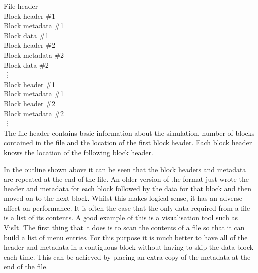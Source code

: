 \documentclass[12pt]{article}
\begin{document}
\noindent
\hspace*{10mm}File header\\
\hspace*{15mm}Block header \#1\\
\hspace*{20mm}Block metadata \#1\\
\hspace*{25mm}Block data \#1\\
\hspace*{15mm}Block header \#2\\
\hspace*{20mm}Block metadata \#2\\
\hspace*{25mm}Block data \#2\\
\hspace*{25mm}\vdots\\
\hspace*{15mm}Block header \#1\\
\hspace*{20mm}Block metadata \#1\\
\hspace*{15mm}Block header \#2\\
\hspace*{20mm}Block metadata \#2\\
\hspace*{25mm}\vdots\\

The file header contains basic information about the simulation, number
of blocks contained in the file and the location of the first block header.
Each block header knows the location of the following block header.

In the outline shown above it can be seen that the block headers and metadata
are repeated at the end of the file. An older version of the format just
wrote the header and metadata for each block followed by the data for
that block and then moved on to the next block. Whilst this makes logical
sense, it has an adverse affect on performance. It is often the case that
the only data required from a file is a list of its contents. A good example
of this is a visualisation tool such as VisIt. The first thing that it
does is to scan the contents of a file so that it can build a list of menu
entries. For this purpose it is much better to have all of the header and
metadata in a contiguous block without having to skip the data block each
time. This can be achieved by placing an extra copy of the metadata at
the end of the file.
\end{document}
